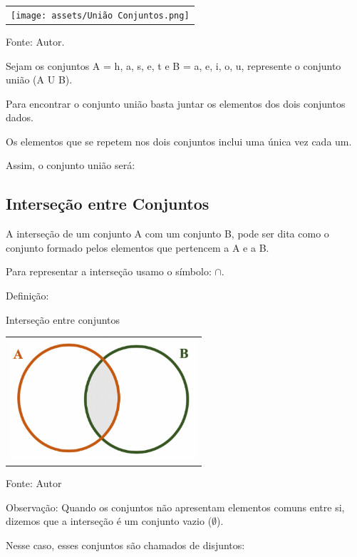 \begin{multicols*}{2}
		\begin{tabular}{@{}c@{}}
		  \texttt{[image: assets/União Conjuntos.png]}
		\end{tabular}

	Fonte: Autor.
	
	Sejam os conjuntos A = {h, a, s, e, t} e B = {a, e, i, o, u}, represente o conjunto união (A U B).

	Para encontrar o conjunto união basta juntar os elementos dos dois conjuntos dados.
	
	Os elementos que se repetem nos dois conjuntos inclui uma única vez cada um.

	Assim, o conjunto união será:


	\subsection{Interseção entre Conjuntos}
	
	A interseção de um conjunto A com um conjunto B, pode ser dita como o conjunto formado pelos elementos que pertencem a A e a B.
			
	Para representar a interseção usamo o símbolo: $ \cap $.
	
	Definição:
	
	
	Interseção entre conjuntos\\
	
		\begin{tabular}{@{}c@{}}
		  \includegraphics[height=45mm]{assets/Conjunto Intersecção.png}
		\end{tabular}
		
   Fonte: Autor
   
   Observação: Quando os conjuntos não apresentam elementos comuns entre si, dizemos que a interseção é um conjunto vazio ($\emptyset$).
   
   Nesse caso, esses conjuntos são chamados de disjuntos:
   

\end{multicols*}
